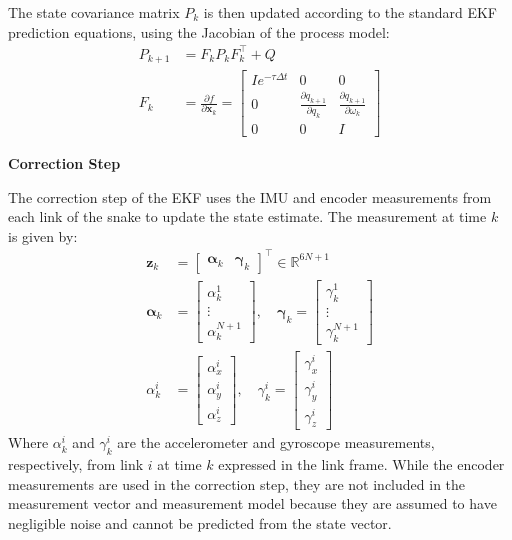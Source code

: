 \documentclass[letterpaper, 10 pt, conference]{ieeeconf}  %
\newcommand{\pd}[2]{\frac{\partial #1}{\partial #2}} %
\begin{document}
The state covariance matrix $P_k$ is then updated according to the standard EKF prediction equations, using the Jacobian of the process model:
\begin{align}
    P_{k+1} &= F_k P_k F_k^\top + Q \\
    F_k &= \pd{f}{\mathbf{x}_k} = \begin{bmatrix}
        I e^{-\tau \Delta t} & 0 & 0 \\
        0 & \pd{q_{k+1}}{q_k} & \pd{q_{k+1}}{\omega_k} \\
        0 & 0 & I
    \end{bmatrix}
\end{align}

\noindent \textbf{Correction Step}

The correction step of the EKF uses the IMU and encoder measurements from each link of the snake to update the state estimate. The measurement at time $k$ is given by:
\begin{align}
    \mathbf{z}_k &= \begin{bmatrix}
        \bm{\alpha}_k & \bm{\gamma}_k
    \end{bmatrix}^\top \in \mathbb{R}^{6N+1} \\
    \bm{\alpha}_k &= \begin{bmatrix}
        \alpha_k^1 \\ \vdots \\ \alpha_k^{N+1}
    \end{bmatrix}, \quad \bm{\gamma}_k = \begin{bmatrix}
        \gamma_k^1 \\ \vdots \\ \gamma_k^{N+1}
    \end{bmatrix} \\
    \alpha_k^i &= \begin{bmatrix}
        \alpha_x^i \\ \alpha_y^i \\ \alpha_z^i
    \end{bmatrix}, \quad \gamma_k^i = \begin{bmatrix}
        \gamma_x^i \\ \gamma_y^i \\ \gamma_z^i
    \end{bmatrix}
\end{align}
Where $\alpha_k^i$ and $\gamma_k^i$ are the accelerometer and gyroscope measurements, respectively, from link $i$ at time $k$ expressed in the link frame. While the encoder measurements are used in the correction step, they are not included in the measurement vector and measurement model because they are assumed to have negligible noise and cannot be predicted from the state vector.
\end{document}
